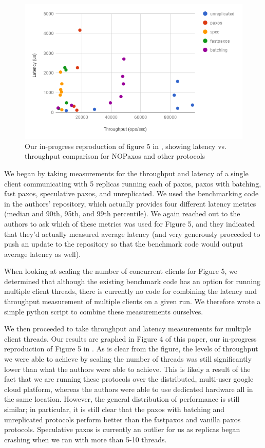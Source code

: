 \begin{figure}[tp]
\centering
\includegraphics[scale=0.4]{figures/figure_5_2.png}
\caption{Our in-progress reproduction of figure 5 in \cite{nopaxos}, showing latency vs. throughput comparison for NOPaxos and other protocols}
\end{figure}

We began by taking measurements for the throughput and latency of a single client communicating with 5 replicas running each of paxos, paxos with batching, fast paxos, speculative paxos, and unreplicated. We used the benchmarking code in the authors' repository, which actually provides four different latency metrics (median and 90th, 95th, and 99th percentile). We again reached out to the authors to ask which of these metrics was used for Figure 5, and they indicated that they'd actually measured average latency (and very generously proceeded to push an update to the repository so that the benchmark code would output average latency as well). 

When looking at scaling the number of concurrent clients for Figure 5, we determined that although the existing benchmark code has an option for running multiple client threads, there is currently no code for combining the latency and throughput measurement of multiple clients on a given run. We therefore wrote a simple python script to combine these measurements ourselves.

We then proceeded to take throughput and latency measurements for multiple client threads. Our results are graphed in Figure 4 of this paper, our in-progress reproduction of Figure 5 in \cite{nopaxos}. As is clear from the figure, the levels of throughput we were able to achieve by scaling the number of threads was still significantly lower than what the authors were able to achieve. This is likely a result of the fact that we are running these protocols over the distributed, multi-user google cloud platform, whereas the authors were able to use dedicated hardware all in the same location. However, the general distribution of performance is still similar; in particular, it is still clear that the paxos with batching and unreplicated protocols perform better than the fastpaxos and vanilla paxos protocols. Speculative paxos is currently an outlier for us as replicas began crashing when we ran with more than 5-10 threads. 

